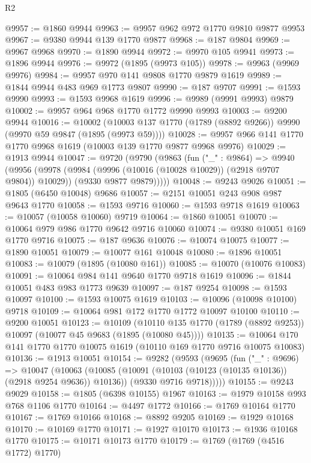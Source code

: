 \begin{lexlean}{R2}
\begin{coremodule}
@9957 := @1860 @9944
@9963 := @9957 @962 @972 @1770 @9810 @9877 @9953
@9967 := @9380 @9944 @139 @1770 @9877
@9968 := @187 @9804
@9969 := @9967 @9968
@9970 := @1890 @9944
@9972 := @9970 @105 @9941
@9973 := @1896 @9944
@9976 := @9972 (@1895 (@9973 @105))
@9978 := @9963 (@9969 @9976)
@9984 := @9957 @970 @141 @9808 @1770 @9879 @1619
@9989 := @1844 @9944 @483 @969 @1773 @9807
@9990 := @187 @9707
@9991 := @1593 @9990
@9993 := @1593 @9968 @1619
@9996 := @9989 (@9991 @9993) @9879
@10002 := @9957 @964 @968 @1770 @1772 @9990 @9993
@10003 := @9200 @9944
@10016 := @10002
    (@10003 @137 @1770 (@1789 (@8892 @9266)) @9990 (@9970 @59 @9847 (@1895 (@9973 @59))))
@10028 := @9957 @966 @141 @1770 @1770 @9968 @1619 (@10003 @139 @1770 @9877 @9968 @9976)
@10029 := @1913 @9944
@10047 := @9720
    (@9790
      (@9863
        (fun ("_" : @9864) =>
        @9940
          (@9956
            (@9978 (@9984 (@9996 (@10016 (@10028 @10029)) (@2918 @9707 @9804)) @10029))
            (@9330 @9877 @9879)))))
@10048 := @9243 @9026
@10051 := @1805 (@6450 @10048) @9686
@10057 := @2151 @10051 @243 @908 @987 @9643 @1770
@10058 := @1593 @9716
@10060 := @1593 @9718 @1619
@10063 := @10057 (@10058 @10060) @9719
@10064 := @1860 @10051
@10070 := @10064 @979 @986 @1770 @9642 @9716 @10060
@10074 := @9380 @10051 @169 @1770 @9716
@10075 := @187 @9636
@10076 := @10074 @10075
@10077 := @1890 @10051
@10079 := @10077 @161 @10048
@10080 := @1896 @10051
@10083 := @10079 (@1895 (@10080 @161))
@10085 := @10070 (@10076 @10083)
@10091 := @10064 @984 @141 @9640 @1770 @9718 @1619
@10096 := @1844 @10051 @483 @983 @1773 @9639
@10097 := @187 @9254
@10098 := @1593 @10097
@10100 := @1593 @10075 @1619
@10103 := @10096 (@10098 @10100) @9718
@10109 := @10064 @981 @172 @1770 @1772 @10097 @10100
@10110 := @9200 @10051
@10123 := @10109
    (@10110 @135 @1770 (@1789 (@8892 @9253)) @10097 (@10077 @45 @9683 (@1895 (@10080 @45))))
@10135 := @10064 @170 @141 @1770 @1770 @10075 @1619 (@10110 @169 @1770 @9716 @10075 @10083)
@10136 := @1913 @10051
@10154 := @9282
    (@9593
      (@9695
        (fun ("_" : @9696) =>
        @10047
          (@10063
            (@10085 (@10091 (@10103 (@10123 (@10135 @10136)) (@2918 @9254 @9636)) @10136))
            (@9330 @9716 @9718)))))
@10155 := @9243 @9029
@10158 := @1805 (@6398 @10155) @1967
@10163 := @1979 @10158 @993 @768 @1106 @1770
@10164 := @4497 @1772
@10166 := @1769 @10164 @1770
@10167 := @1769 @10166
@10168 := @8892 @9205
@10169 := @1929 @10168
@10170 := @10169 @1770
@10171 := @1927 @10170
@10173 := @1936 @10168 @1770
@10175 := @10171 @10173 @1770
@10179 := @1769 (@1769 (@4516 @1772) @1770)

\end{coremodule}
\end{lexlean}

